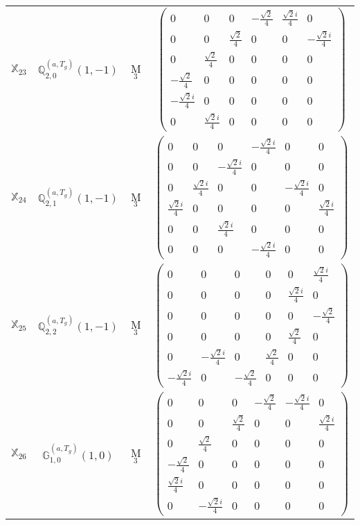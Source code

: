 \documentclass[fleqn,10pt,landscape]{article}
\begin{document}
\begin{itemize}
\begin{center}
\begin{longtable}{c|c|c|c}
$ \mathbb{X}_{23} $ & $\mathbb{Q}_{2,0}^{(a,T_{g})}(1,-1)$ & M$_{3}$ & $\begin{pmatrix} 0 & 0 & 0 & - \frac{\sqrt{2}}{4} & \frac{\sqrt{2} i}{4} & 0 \\ 0 & 0 & \frac{\sqrt{2}}{4} & 0 & 0 & - \frac{\sqrt{2} i}{4} \\ 0 & \frac{\sqrt{2}}{4} & 0 & 0 & 0 & 0 \\ - \frac{\sqrt{2}}{4} & 0 & 0 & 0 & 0 & 0 \\ - \frac{\sqrt{2} i}{4} & 0 & 0 & 0 & 0 & 0 \\ 0 & \frac{\sqrt{2} i}{4} & 0 & 0 & 0 & 0 \end{pmatrix}$ \\
$ \mathbb{X}_{24} $ & $\mathbb{Q}_{2,1}^{(a,T_{g})}(1,-1)$ & M$_{3}$ & $\begin{pmatrix} 0 & 0 & 0 & - \frac{\sqrt{2} i}{4} & 0 & 0 \\ 0 & 0 & - \frac{\sqrt{2} i}{4} & 0 & 0 & 0 \\ 0 & \frac{\sqrt{2} i}{4} & 0 & 0 & - \frac{\sqrt{2} i}{4} & 0 \\ \frac{\sqrt{2} i}{4} & 0 & 0 & 0 & 0 & \frac{\sqrt{2} i}{4} \\ 0 & 0 & \frac{\sqrt{2} i}{4} & 0 & 0 & 0 \\ 0 & 0 & 0 & - \frac{\sqrt{2} i}{4} & 0 & 0 \end{pmatrix}$ \\
$ \mathbb{X}_{25} $ & $\mathbb{Q}_{2,2}^{(a,T_{g})}(1,-1)$ & M$_{3}$ & $\begin{pmatrix} 0 & 0 & 0 & 0 & 0 & \frac{\sqrt{2} i}{4} \\ 0 & 0 & 0 & 0 & \frac{\sqrt{2} i}{4} & 0 \\ 0 & 0 & 0 & 0 & 0 & - \frac{\sqrt{2}}{4} \\ 0 & 0 & 0 & 0 & \frac{\sqrt{2}}{4} & 0 \\ 0 & - \frac{\sqrt{2} i}{4} & 0 & \frac{\sqrt{2}}{4} & 0 & 0 \\ - \frac{\sqrt{2} i}{4} & 0 & - \frac{\sqrt{2}}{4} & 0 & 0 & 0 \end{pmatrix}$ \\
$ \mathbb{X}_{26} $ & $\mathbb{G}_{1,0}^{(a,T_{g})}(1,0)$ & M$_{3}$ & $\begin{pmatrix} 0 & 0 & 0 & - \frac{\sqrt{2}}{4} & - \frac{\sqrt{2} i}{4} & 0 \\ 0 & 0 & \frac{\sqrt{2}}{4} & 0 & 0 & \frac{\sqrt{2} i}{4} \\ 0 & \frac{\sqrt{2}}{4} & 0 & 0 & 0 & 0 \\ - \frac{\sqrt{2}}{4} & 0 & 0 & 0 & 0 & 0 \\ \frac{\sqrt{2} i}{4} & 0 & 0 & 0 & 0 & 0 \\ 0 & - \frac{\sqrt{2} i}{4} & 0 & 0 & 0 & 0 \end{pmatrix}$ \\

\end{longtable}
\end{center}
\end{itemize}
\end{document}
